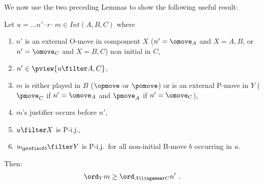 We now use the two preceding Lemmas to show
the following useful result:
\begin{lemma}
\label{lem:increasing_order}
Let $u = \ldots n' \cdot r \cdot m \in Int(A,B,C)$ where
\begin{enumerate}
\item
$n'$ is an external O-move in compoment $X$
($n'=\omove_A$ and $X=A,B$, or $n'=\omove_C$ and $X=B,C$)  non initial in $C$,
\item $n' \in \pview{u\filter A,C}$,
\item $m$ is either played in $B$
($\opmove$ or $\pomove$) or is an external
 P-move in $Y$
($\pmove_C$ if $n'=\omove_A$ and
$\pmove_A$ if $n'=\omove_C$),
\item $m$'s justifier occurs before $n'$,
\item $u\filter X$ is P-i.j.,
\item $u_{\prefixof b}\filter Y$ is P-i.j.\ for all non-initial B-move $b$ occurring in $u$.
\end{enumerate}
Then:
$$ \ord_{Y} m \geq \ord_{A\lingamear C} n' \ .$$
\end{lemma}

